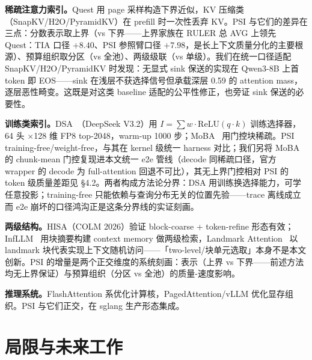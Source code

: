 \documentclass[11pt]{article}
\begin{document}
\textbf{稀疏注意力索引。}Quest 用 page 采样构造下界近似，KV 压缩类（SnapKV/H2O/PyramidKV）在 prefill 时一次性丢弃 KV。PSI 与它们的差异在三点：分数表示取上界（vs 下界——上界家族在 RULER 总 AVG 上领先 Quest：TIA 口径 $+8.40$、PSI 参照臂口径 $+7.98$，是长上下文质量分化的主要根源）、预算组织取分区（vs 全池）、两级级联（vs 单级）。我们在统一口径适配 SnapKV/H2O/PyramidKV 时发现：无显式 sink 保送的实现在 Qwen3-8B 上首 token 即 EOS——sink 在浅层不获选择信号但承载深层 0.59 的 attention mass，逐层恶性畸变。这既是对这类 baseline 适配的公平性修正，也旁证 sink 保送的必要性。

\textbf{训练类索引。}DSA~\cite{dsa}（DeepSeek V3.2）用 $I=\sum w\cdot\mathrm{ReLU}(q\cdot k)$ 训练选择器，64 头 $\times$128 维 FP8 top-2048，warm-up 1000 步；MoBA~\cite{moba} 用门控块稀疏。PSI training-free/weight-free，与其在 kernel 级统一 harness 对比；我们另将 MoBA 的 chunk-mean 门控复现进本文统一 e2e 管线（decode 同稀疏口径，官方 wrapper 的 decode 为 full-attention 回退不可比），其无上界门控相对 PSI 的 token 级质量差距见 §4.2。两者构成方法论分界：DSA 用训练换选择能力，可学任意投影；training-free 只能依赖与查询分布无关的位置先验——trace 离线成立而 e2e 崩坏的口径鸿沟正是这条分界线的实证刻画。

\textbf{两级结构。}HISA（COLM 2026）验证 block-coarse + token-refine 形态有效；InfLLM~\cite{infllm} 用块摘要构建 context memory 做两级检索，Landmark Attention~\cite{landmark} 以 landmark 块代表实现上下文随机访问——「two-level/块单元选取」本身不是本文创新。PSI 的增量是两个正交维度的系统刻画：表示（上界 vs 下界——前述方法均无上界保证）与预算组织（分区 vs 全池）的质量-速度影响。

\textbf{推理系统。}FlashAttention 系优化计算核，PagedAttention/vLLM 优化显存组织。PSI 与它们正交，在 sglang 生产形态集成。

\section{局限与未来工作}
\end{document}
